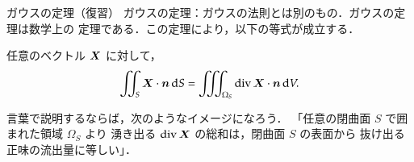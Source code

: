             \begin{memo}{ガウスの定理（復習）}
                ガウスの定理：ガウスの法則とは別のもの．ガウスの定理は数学上の
                              定理である．この定理により，以下の等式が成立する．

                                任意のベクトル $\boldsymbol{X}$ に対して，
                                \begin{equation*}
                                      \int\mspace{-11mu}\int_{S} \boldsymbol{X} \cdot \boldsymbol{n} \,\mathrm{d} S
                                    = \int\mspace{-11mu}\int\mspace{-11mu}\int_{\Omega_{S}} \mathrm{div}\, \boldsymbol{X} \cdot \boldsymbol{n} \,\mathrm{d} V.
                                \end{equation*}

                                言葉で説明するならば，次のようなイメージになろう．
                                「任意の閉曲面 $S$ で囲まれた領域 $\Omega_{S}$ より
                                湧き出る $\mathrm{div}\, \boldsymbol{X}$ の総和は，閉曲面 $S$ の表面から
                                抜け出る正味の流出量に等しい」．
            \end{memo}

